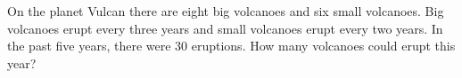 On the planet Vulcan there are eight big volcanoes and six small volcanoes. Big volcanoes erupt every three years and small volcanoes erupt every two years. In the past five years, there were $30$ eruptions. How many volcanoes could erupt this year?
